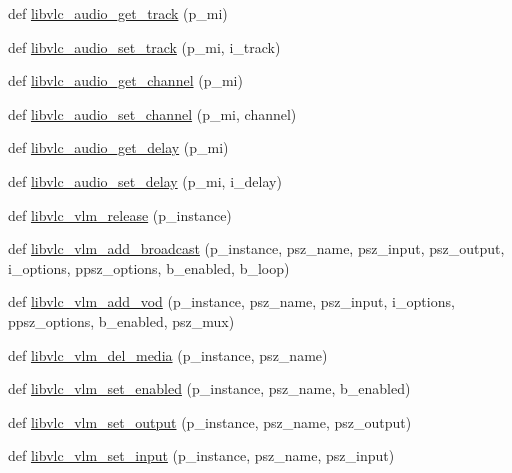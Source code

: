 \begin{DoxyCompactItemize}
def \hyperlink{namespacesrc_1_1lib_1_1vlc_a4152e8e19f9ea8182068112c249d2628}{libvlc\+\_\+audio\+\_\+get\+\_\+track} (p\+\_\+mi)
\item 
def \hyperlink{namespacesrc_1_1lib_1_1vlc_ad4fa22c0e8472c56093d8dc99ed42f71}{libvlc\+\_\+audio\+\_\+set\+\_\+track} (p\+\_\+mi, i\+\_\+track)
\item 
def \hyperlink{namespacesrc_1_1lib_1_1vlc_a9cc7d5b6f988663a70fbed47f781a2be}{libvlc\+\_\+audio\+\_\+get\+\_\+channel} (p\+\_\+mi)
\item 
def \hyperlink{namespacesrc_1_1lib_1_1vlc_af729e225bd65124a1c0eef24e714279c}{libvlc\+\_\+audio\+\_\+set\+\_\+channel} (p\+\_\+mi, channel)
\item 
def \hyperlink{namespacesrc_1_1lib_1_1vlc_a57e78e40d30c889a13322d217e648cba}{libvlc\+\_\+audio\+\_\+get\+\_\+delay} (p\+\_\+mi)
\item 
def \hyperlink{namespacesrc_1_1lib_1_1vlc_ae009f83daec13bcc3c755dbfb1ff9bf1}{libvlc\+\_\+audio\+\_\+set\+\_\+delay} (p\+\_\+mi, i\+\_\+delay)
\item 
def \hyperlink{namespacesrc_1_1lib_1_1vlc_ae5942ab852e862480de67eeb45f43247}{libvlc\+\_\+vlm\+\_\+release} (p\+\_\+instance)
\item 
def \hyperlink{namespacesrc_1_1lib_1_1vlc_ae6f66278c975d28fde0cb5fee024be6a}{libvlc\+\_\+vlm\+\_\+add\+\_\+broadcast} (p\+\_\+instance, psz\+\_\+name, psz\+\_\+input, psz\+\_\+output, i\+\_\+options, ppsz\+\_\+options, b\+\_\+enabled, b\+\_\+loop)
\item 
def \hyperlink{namespacesrc_1_1lib_1_1vlc_a7e8582db73ac9c9cb4d9a6def6d7ee01}{libvlc\+\_\+vlm\+\_\+add\+\_\+vod} (p\+\_\+instance, psz\+\_\+name, psz\+\_\+input, i\+\_\+options, ppsz\+\_\+options, b\+\_\+enabled, psz\+\_\+mux)
\item 
def \hyperlink{namespacesrc_1_1lib_1_1vlc_a1f10a310ea3ba69b02cbb4b0cf2d0ff6}{libvlc\+\_\+vlm\+\_\+del\+\_\+media} (p\+\_\+instance, psz\+\_\+name)
\item 
def \hyperlink{namespacesrc_1_1lib_1_1vlc_af517ce3e6600d92e713aaacd2cf05f07}{libvlc\+\_\+vlm\+\_\+set\+\_\+enabled} (p\+\_\+instance, psz\+\_\+name, b\+\_\+enabled)
\item 
def \hyperlink{namespacesrc_1_1lib_1_1vlc_aa1ad2f8a11dadf4af4f9312167e367c3}{libvlc\+\_\+vlm\+\_\+set\+\_\+output} (p\+\_\+instance, psz\+\_\+name, psz\+\_\+output)
\item 
def \hyperlink{namespacesrc_1_1lib_1_1vlc_ae77ae3a090086f63e2340cc96798f957}{libvlc\+\_\+vlm\+\_\+set\+\_\+input} (p\+\_\+instance, psz\+\_\+name, psz\+\_\+input)

\end{DoxyCompactItemize}
